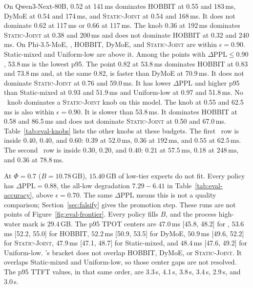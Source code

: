 On Qwen3-Next-80B, 0.52 at 141\,ms dominates HOBBIT at 0.55 and 183\,ms, DyMoE at 0.54 and 174\,ms, and \textsc{Static-Joint} at 0.54 and 168\,ms. It does not dominate 0.62 at 117\,ms or 0.66 at 117\,ms. The knob 0.36 at 192\,ms dominates \textsc{Static-Joint} at 0.38 and 200\,ms and does not dominate HOBBIT at 0.32 and 240\,ms.
On Phi-3.5-MoE, \systemname, HOBBIT, DyMoE, and \textsc{Static-Joint} are within \(\epsilon=0.90\). Static-mixed and Uniform-low are above it. Among the points with \(\Delta\mathrm{PPL}\le 0.90\), 53.8\,ms is the lowest p95. The point 0.82 at 53.8\,ms dominates HOBBIT at 0.83 and 73.8\,ms and, at the same 0.82, is faster than DyMoE at 70.9\,ms. It does not dominate \textsc{Static-Joint} at 0.76 and 59.0\,ms. It has lower \(\Delta\mathrm{PPL}\) and higher p95 than Static-mixed at 0.93 and 51.9\,ms and Uniform-low at 0.97 and 51.8\,ms. No \systemname\ knob dominates a \textsc{Static-Joint} knob on this model.
The knob at 0.55 and 62.5\,ms is also within \(\epsilon=0.90\). It is slower than 53.8\,ms. It dominates HOBBIT at 0.58 and 86.5\,ms and does not dominate \textsc{Static-Joint} at 0.50 and 67.0\,ms.
Table~\ref{tab:eval-knobs} lists the other knobs at these budgets. The first \systemname\ row is inside \(0.40\), \(0.40\), and \(0.60\): \(0.39\) at \(52.0\,\mathrm{ms}\), \(0.36\) at \(192\,\mathrm{ms}\), and \(0.55\) at \(62.5\,\mathrm{ms}\). The second \systemname\ row is inside \(0.30\), \(0.20\), and \(0.40\): \(0.21\) at \(57.5\,\mathrm{ms}\), \(0.18\) at \(248\,\mathrm{ms}\), and \(0.36\) at \(78.8\,\mathrm{ms}\).

At \(\Phi=0.7\) (\(B=10.78\)\,GB), \(15.40\)\,GB of low-tier experts do not fit. Every policy has \(\Delta\mathrm{PPL}=0.88\), the all-low degradation \(7.29-6.41\) in Table~\ref{tab:eval-accuracy}, above \(\epsilon=0.70\). The same \(\Delta\mathrm{PPL}\) means this is not a quality comparison; Section~\ref{sec:falsify} gives the promotion step. These runs are not points of Figure~\ref{fig:eval-frontier}. Every policy fills \(B\), and the process high-water mark is \(29.4\)\,GB. The p95 TPOT centers are \(47.0\)\,ms [45.8, 48.2] for \systemname, \(53.6\)\,ms [52.2, 55.0] for HOBBIT, \(52.2\)\,ms [50.9, 53.5] for DyMoE, \(50.9\)\,ms [49.6, 52.2] for \textsc{Static-Joint}, \(47.9\)\,ms [47.1, 48.7] for Static-mixed, and \(48.4\)\,ms [47.6, 49.2] for Uniform-low. \systemname's bracket does not overlap HOBBIT, DyMoE, or \textsc{Static-Joint}. It overlaps Static-mixed and Uniform-low, so those center gaps are not resolved. The p95 TTFT values, in that same order, are 3.3\,s, 4.1\,s, 3.8\,s, 3.4\,s, 2.9\,s, and 3.0\,s.

